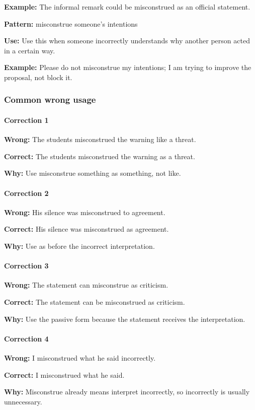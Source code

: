 \documentclass[11pt]{article}
\begin{document}
\textbf{Example:} The informal remark could be misconstrued as an official statement.

\textbf{Pattern:} misconstrue someone's intentions

\textbf{Use:} Use this when someone incorrectly understands why another person acted in a certain way.

\textbf{Example:} Please do not misconstrue my intentions; I am trying to improve the proposal, not block it.

\subsubsection{Common wrong usage}
\paragraph{Correction 1}
\textbf{Wrong:} The students misconstrued the warning like a threat.

\textbf{Correct:} The students misconstrued the warning as a threat.

\textbf{Why:} Use misconstrue something as something, not like.

\paragraph{Correction 2}
\textbf{Wrong:} His silence was misconstrued to agreement.

\textbf{Correct:} His silence was misconstrued as agreement.

\textbf{Why:} Use as before the incorrect interpretation.

\paragraph{Correction 3}
\textbf{Wrong:} The statement can misconstrue as criticism.

\textbf{Correct:} The statement can be misconstrued as criticism.

\textbf{Why:} Use the passive form because the statement receives the interpretation.

\paragraph{Correction 4}
\textbf{Wrong:} I misconstrued what he said incorrectly.

\textbf{Correct:} I misconstrued what he said.

\textbf{Why:} Misconstrue already means interpret incorrectly, so incorrectly is usually unnecessary.
\end{document}
